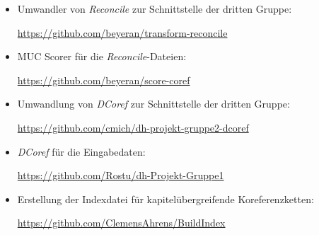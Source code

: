 \documentclass[a4paper,12pt,titlepage=true, ngerman]{scrartcl}
\begin{document}
\begin{itemize}
  \item Umwandler von \emph{Reconcile} zur Schnittstelle der dritten Gruppe:\par \url{https://github.com/beyeran/transform-reconcile}\vspace{0.3cm}
  \item MUC Scorer für die \emph{Reconcile}-Dateien:\par \url{https://github.com/beyeran/score-coref}\vspace{0.3cm}
  \item Umwandlung von \emph{DCoref} zur Schnittstelle der dritten Gruppe:\par \url{https://github.com/cmich/dh-projekt-gruppe2-dcoref}\vspace{0.3cm}
  \item \emph{DCoref} für die Eingabedaten:\par \url{https://github.com/Rostu/dh-Projekt-Gruppe1}\vspace{0.3cm}
  \item Erstellung der Indexdatei für kapitelübergreifende Koreferenzketten: \par \url{https://github.com/ClemensAhrens/BuildIndex}\vspace{0.3cm}
\end{itemize}



\newpage

\printbibliography[title=Literaturverzeichnis, heading=bibintoc]
\end{document}
